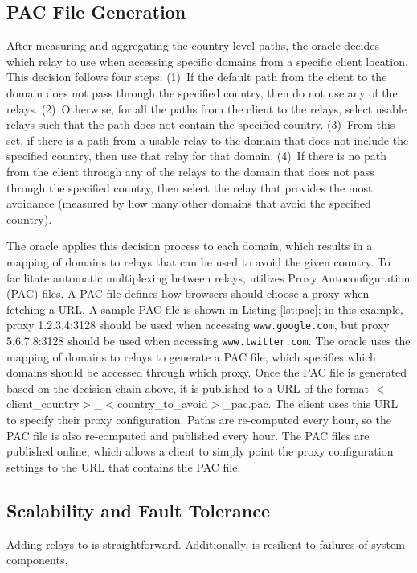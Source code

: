 \subsection{PAC File Generation}
\label{multiplex}
After measuring and aggregating the country-level paths, the oracle decides 
which relay to use when accessing specific domains from a specific client 
location.  This decision follows four steps:
(1)~If the default path from the client to the domain does not pass through 
the specified country, then do not use any of the relays. 
(2)~Otherwise, for all the paths from the client to the relays, select usable relays 
such that the path does not contain the specified country.
(3)~From this set, if there is a path from a 
usable relay to the domain that does not include the specified country, then 
use that relay for that domain.
(4)~If there is no path from the client through any of the relays to the domain 
that does not pass through the specified country, then select the relay 
that provides the most avoidance (measured by how many other domains
that avoid the specified country). 

The oracle applies this decision process to each domain, which results in a mapping 
of domains to relays that can be used to avoid the given country.  To facilitate 
automatic multiplexing between relays, \system{} utilizes Proxy Autoconfiguration (PAC) 
files.  A PAC file defines how browsers should choose a proxy when fetching a URL.  A 
sample PAC file is shown in Listing \ref{lst:pac}; in this example, proxy 
1.2.3.4:3128 should be used when accessing {\tt www.google.com}, but proxy 
5.6.7.8:3128 should be used when accessing {\tt www.twitter.com}.  The oracle uses 
the mapping of domains to relays to generate a PAC 
file, which specifies which domains should be accessed through which proxy.  Once the PAC 
file is generated based on the decision chain above, it is published to a URL 
of the format $<$client\_country$>$\_$<$country\_to\_avoid$>$\_pac.pac.  The client 
uses this URL to specify their proxy configuration.  Paths are re-computed 
every hour, so the PAC file is also re-computed and published every hour.  The PAC files 
are published online, which allows a client to simply point the proxy
configuration settings to the URL that contains the PAC file. 



\subsection{Scalability and Fault Tolerance}
Adding relays to \system{} is 
straightforward. Additionally, \system{} is resilient to failures of system components.

